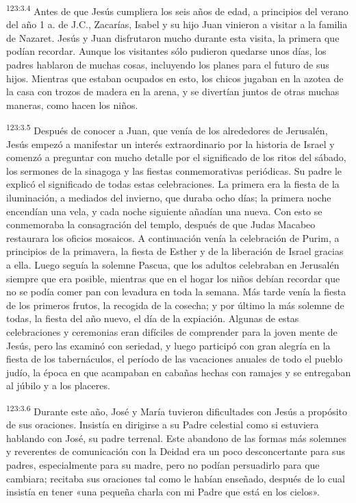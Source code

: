 \par
\textsuperscript{123:3.4} Antes de que Jesús cumpliera los seis años de edad, a principios del verano del año 1 a. de J.C., Zacarías, Isabel y su hijo Juan vinieron a visitar a la familia de Nazaret. Jesús y Juan disfrutaron mucho durante esta visita, la primera que podían recordar. Aunque los visitantes sólo pudieron quedarse unos días, los padres hablaron de muchas cosas, incluyendo los planes para el futuro de sus hijos. Mientras que estaban ocupados en esto, los chicos jugaban en la azotea de la casa con trozos de madera en la arena, y se divertían juntos de otras muchas maneras, como hacen los niños.

\par
\textsuperscript{123:3.5} Después de conocer a Juan, que venía de los alrededores de Jerusalén, Jesús empezó a manifestar un interés extraordinario por la historia de Israel y comenzó a preguntar con mucho detalle por el significado de los ritos del sábado, los sermones de la sinagoga y las fiestas conmemorativas periódicas. Su padre le explicó el significado de todas estas celebraciones. La primera era la fiesta de la iluminación, a mediados del invierno, que duraba ocho días; la primera noche encendían una vela, y cada noche siguiente añadían una nueva. Con esto se conmemoraba la consagración del templo, después de que Judas Macabeo restaurara los oficios mosaicos. A continuación venía la celebración de Purim, a principios de la primavera, la fiesta de Esther y de la liberación de Israel gracias a ella. Luego seguía la solemne Pascua, que los adultos celebraban en Jerusalén siempre que era posible, mientras que en el hogar los niños debían recordar que no se podía comer pan con levadura en toda la semana. Más tarde venía la fiesta de los primeros frutos, la recogida de la cosecha; y por último la más solemne de todas, la fiesta del año nuevo, el día de la expiación. Algunas de estas celebraciones y ceremonias eran difíciles de comprender para la joven mente de Jesús, pero las examinó con seriedad, y luego participó con gran alegría en la fiesta de los tabernáculos, el período de las vacaciones anuales de todo el pueblo judío, la época en que acampaban en cabañas hechas con ramajes y se entregaban al júbilo y a los placeres.

\par
\textsuperscript{123:3.6} Durante este año, José y María tuvieron dificultades con Jesús a propósito de sus oraciones. Insistía en dirigirse a su Padre celestial como si estuviera hablando con José, su padre terrenal. Este abandono de las formas más solemnes y reverentes de comunicación con la Deidad era un poco desconcertante para sus padres, especialmente para su madre, pero no podían persuadirlo para que cambiara; recitaba sus oraciones tal como le habían enseñado, después de lo cual insistía en tener «una pequeña charla con mi Padre que está en los cielos».


